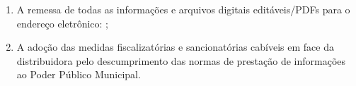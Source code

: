 \begin{enumerate}[resume]
\begin{enumerate}
\begin{itemize}
        \ifItemTOIsVinculados\else\item Histórico completo e cópias de TOIs lavrados na UC nos últimos 5 anos com a discriminação de faturamentos;\fi
    \end{itemize}
    \item A remessa de todas as informações e arquivos digitais editáveis/PDFs para o endereço eletrônico: \emailEmpresa{};
    \item A adoção das medidas fiscalizatórias e sancionatórias cabíveis em face da distribuidora pelo descumprimento das normas de prestação de informações ao Poder Público Municipal.
    \end{enumerate}
\end{enumerate}